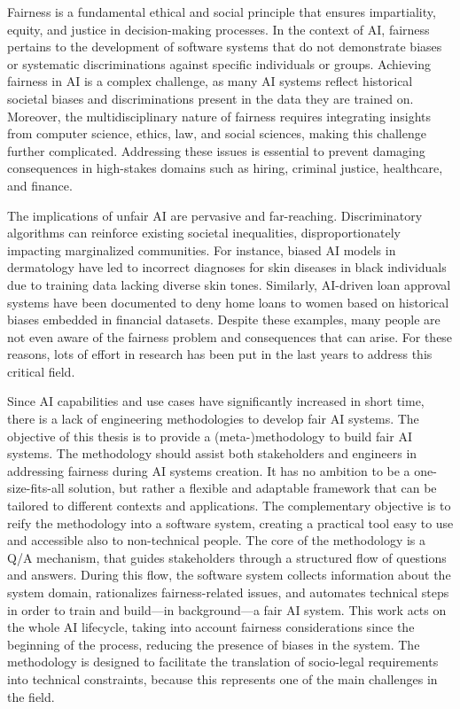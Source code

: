 \documentclass[12pt,a4paper,openright,twoside]{book}
\begin{document}
Fairness is a fundamental ethical and social principle that ensures impartiality, equity, and justice in decision-making processes.
%
In the context of \acf{AI}, fairness pertains to the development of software systems that do not demonstrate biases or systematic discriminations against specific individuals or groups.
%
Achieving fairness in \ac{AI} is a complex challenge, as many \ac{AI} systems reflect historical societal biases and discriminations present in the data they are trained on.
%
Moreover, the multidisciplinary nature of fairness requires integrating insights from computer science, ethics, law, and social sciences, making this challenge further complicated.
%
Addressing these issues is essential to prevent damaging consequences in high-stakes domains such as hiring, criminal justice, healthcare, and finance.


The implications of unfair \ac{AI} are pervasive and far-reaching.
%
Discriminatory algorithms can reinforce existing societal inequalities, disproportionately impacting marginalized communities.
%
For instance, biased AI models in dermatology have led to incorrect diagnoses for skin diseases in black individuals due to training data lacking diverse skin tones.
%
Similarly, AI-driven loan approval systems have been documented to deny home loans to women
based on historical biases embedded in financial datasets.
%
Despite these examples, many people are not even aware of the fairness problem and consequences that can arise.
%
For these reasons, lots of effort in research has been put in the last years to address this critical field.

Since \ac{AI} capabilities and use cases have significantly increased in short time, there is a lack of engineering methodologies to develop fair \ac{AI} systems.
%
The objective of this thesis is to provide a (meta-)methodology to build fair \ac{AI} systems.
%
The methodology should assist both stakeholders and engineers in addressing fairness during \ac{AI} systems creation.
%
It has no ambition to be a one-size-fits-all solution, but rather a flexible and adaptable framework that can be tailored to different contexts and applications.
%
The complementary objective is to reify the methodology into a software system, creating a practical tool easy to use and accessible also to non-technical people.
%
The core of the methodology is a \acf{Q/A} mechanism, that guides stakeholders through a structured flow of questions and answers.
%
During this flow, the software system collects information about the system domain, rationalizes fairness-related issues, and automates technical steps in order to train and build---in background---a fair \ac{AI} system.
%
This work acts on the whole \ac{AI} lifecycle, taking into account fairness considerations since the beginning of the process, reducing the presence of biases in the system.
%
The methodology is designed to facilitate the translation of socio-legal requirements into technical constraints, because this represents one of the main challenges in the field.
\end{document}
